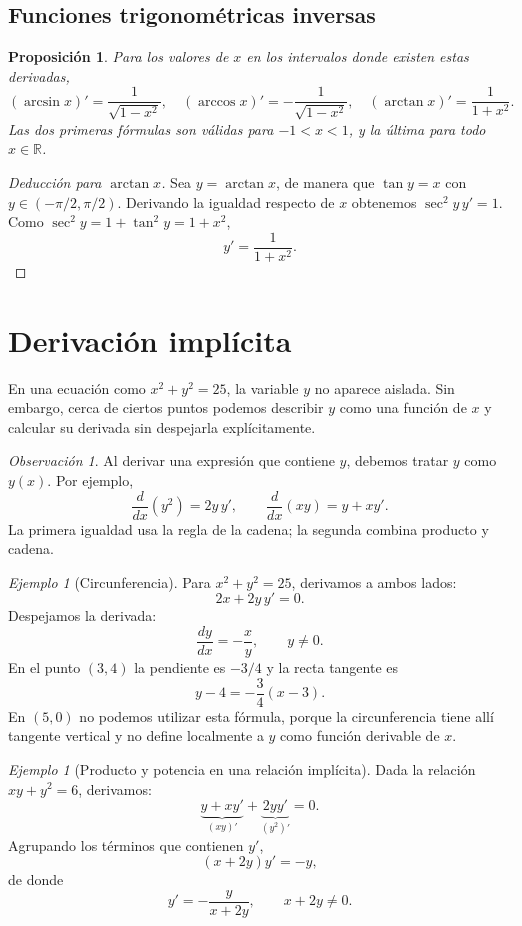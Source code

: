 \documentclass[12pt]{article}
\newtheorem{proposicion}[definicion]{Proposición}
\theoremstyle{remark}
\newtheorem{observacion}[definicion]{Observación}
\newtheorem{ejemplo}[definicion]{Ejemplo}
\newcommand{\R}{\mathbb{R}}
\begin{document}
\subsection*{Funciones trigonométricas inversas}
\begin{proposicion}
Para los valores de $x$ en los intervalos donde existen estas derivadas,
\[
\boxed{(\arcsin x)'=\frac1{\sqrt{1-x^2}},\quad
(\arccos x)'=-\frac1{\sqrt{1-x^2}},\quad
(\arctan x)'=\frac1{1+x^2}.}
\]
Las dos primeras fórmulas son válidas para $-1<x<1$, y la última para todo $x\in\R$.
\end{proposicion}

\begin{proof}[Deducción para $\arctan x$]
Sea $y=\arctan x$, de manera que $\tan y=x$ con $y\in(-\pi/2,\pi/2)$. Derivando la igualdad respecto de $x$ obtenemos $\sec^2y\,y'=1$. Como $\sec^2y=1+\tan^2y=1+x^2$,
\[\boxed{y'=\frac1{1+x^2}.}\]
\end{proof}

\section{Derivación implícita}
En una ecuación como $x^2+y^2=25$, la variable $y$ no aparece aislada. Sin embargo, cerca de ciertos puntos podemos describir $y$ como una función de $x$ y calcular su derivada sin despejarla explícitamente.

\begin{observacion}
Al derivar una expresión que contiene $y$, debemos tratar $y$ como $y(x)$. Por ejemplo,
\[
\frac{d}{dx}(y^2)=2y\,y',\qquad
\frac{d}{dx}(xy)=y+xy'.
\]
La primera igualdad usa la regla de la cadena; la segunda combina producto y cadena.
\end{observacion}

\begin{ejemplo}[Circunferencia]
Para $x^2+y^2=25$, derivamos a ambos lados:
\[
2x+2y\,y'=0.
\]
Despejamos la derivada:
\[
\boxed{\frac{dy}{dx}=-\frac{x}{y},\qquad y\ne0.}
\]
En el punto $(3,4)$ la pendiente es $-3/4$ y la recta tangente es
\[
y-4=-\frac34(x-3).
\]
En $(5,0)$ no podemos utilizar esta fórmula, porque la circunferencia tiene allí tangente vertical y no define localmente a $y$ como función derivable de $x$.
\end{ejemplo}

\begin{ejemplo}[Producto y potencia en una relación implícita]
Dada la relación $xy+y^2=6$, derivamos:
\[
\underbrace{y+xy'}_{(xy)'}+\underbrace{2yy'}_{(y^2)'}=0.
\]
Agrupando los términos que contienen $y'$,
\[
(x+2y)y'=-y,
\]
de donde
\[
\boxed{y'=-\frac{y}{x+2y}},\qquad x+2y\ne0.
\]
\end{ejemplo}
\end{document}
